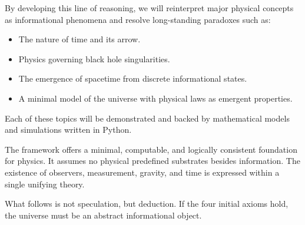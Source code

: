 \documentclass[11pt]{article}
\begin{document}
By developing this line of reasoning, we will reinterpret major physical concepts as informational phenomena and resolve long-standing paradoxes such as:

\begin{itemize}
      \item The nature of time and its arrow.
      \item Physics governing black hole singularities.
      \item The emergence of spacetime from discrete informational states.
      \item A minimal model of the universe with physical laws as emergent properties.
\end{itemize}

Each of these topics will be demonstrated and backed by mathematical models and simulations written in Python.

The framework offers a minimal, computable, and logically consistent foundation for physics. It assumes no physical predefined substrates besides information. The existence of observers, measurement, gravity, and time is expressed within a single unifying theory.

What follows is not speculation, but deduction. If the four initial axioms hold, the universe must be an abstract informational object.
\end{document}
